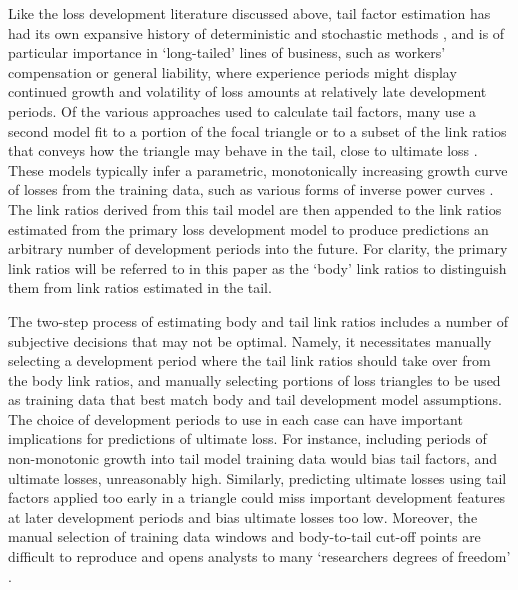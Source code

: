 Like the loss development literature discussed above, 
tail factor estimation has had its own expansive history
of deterministic and stochastic methods \citep{tailfactors2013}, and is of particular
importance in `long-tailed' lines of business, such as workers' compensation or general
liability, where experience periods might display continued growth and 
volatility of loss amounts at relatively late development periods.
Of the various approaches used to calculate tail factors, many 
use a second model fit to a portion
of the focal triangle or to a subset of the link ratios
that conveys how the triangle may behave
in the tail, close to ultimate loss \citep{tailfactors2013}.
These models typically 
infer a parametric, monotonically
increasing growth curve of losses from the training data, 
such as various forms of
inverse power curves \citep[e.g.][]{sherman1984,evans2015,clark2017}.
The link ratios derived from this tail model are then appended to
the link ratios estimated from the primary loss development model
to produce predictions an
arbitrary number of development periods into the future.
For clarity, the primary link ratios will be referred to
in this paper as the `body' link ratios to distinguish them from 
link ratios estimated in the tail.

The two-step process of estimating body and tail link ratios
includes a number of 
subjective decisions that may not be optimal. 
Namely, it necessitates manually selecting a development 
period where the tail link ratios should take over from
the body link ratios, and manually selecting portions of
loss triangles to be used as training data that best match
body and tail development model assumptions.
The choice of development periods to use in each case
can have important implications for predictions of ultimate
loss.
For instance, including periods
of non-monotonic growth into tail model training
data would bias
tail factors, and ultimate losses, unreasonably high. 
Similarly, predicting
ultimate losses using tail factors applied too early
in a triangle
could miss important development features at later
development periods and bias ultimate losses too low. 
Moreover, the manual selection of training data windows
and body-to-tail cut-off points
are difficult to reproduce and
opens analysts to many `researchers degrees of freedom' \citep{simmons2011}.

